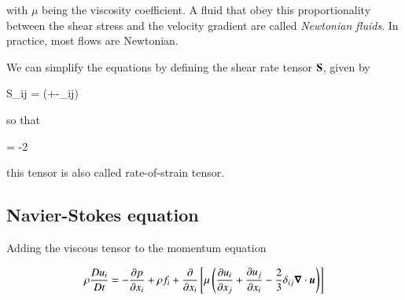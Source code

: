 \noindent with $\mu$ being the viscosity coefficient. A fluid that obey this proportionality between the shear stress and the
velocity gradient are called {\it Newtonian fluids}. In practice, most
flows are Newtonian.  

We can simplify the equations by defining the shear rate tensor
$\boldsymbol{\mathrm{S}}$, given by 

\beq
S_{ij} = \left(+-\delta_{ij}\right)
\eeq


\noindent so that 

\beq
\vt{\pi} = -2\mu{}
\eeq

\noindent this tensor is also called rate-of-strain tensor. 


\subsection{Navier-Stokes equation}

Adding the viscous tensor to the momentum equation

\begin{equation}
\rho\frac{D u_i}{D t}  = -\frac{\partial p}{\partial x_i} +\rho f_i +
\frac{\partial }{\partial x_i}\left[ \mu\left(\frac{\partial
      u_i}{\partial x_j}+\frac{\partial u_j}{\partial
      x_i}-\frac{2}{3}\delta_{ij}{\boldsymbol{\nabla}}\cdot{{\boldsymbol{u}}}\right)\right] 
\end{equation}






